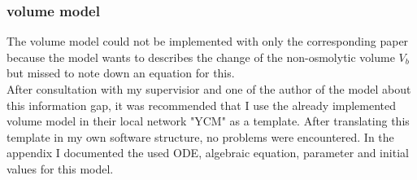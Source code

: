 \subsubsection{volume model}
The volume model could not be implemented with only the corresponding paper because the model wants to describes the change of the non-osmolytic volume $V_b$ but missed to note down an equation for this.\\
After consultation with my supervisior and one of the author of the model about this information gap, it was recommended that I use the already implemented volume model in their local network "YCM" as a template. After translating this template in my own software structure, no problems were encountered. In the appendix I documented the used ODE, algebraic equation, parameter and initial values for this model. 
